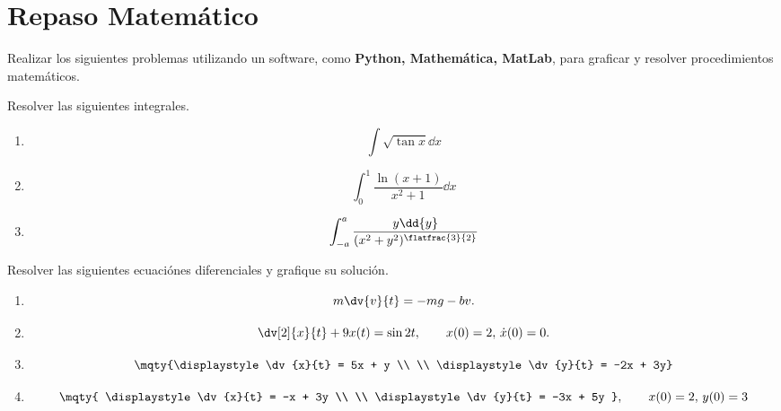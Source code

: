 \section{Repaso Matemático}

Realizar los siguientes problemas utilizando un software, como \textbf{Python, Mathemática, MatLab}, para graficar y resolver procedimientos matemáticos.

\begin{mdframed}[style=warning]
	\begin{ejercicio}
		Resolver las siguientes integrales.
		\begin{enumerate}
			\item $$\int \sqrt{\tan{x}} \dd{x}$$
			\item $$\int _0 ^1 \frac{\ln{(x + 1)}}{x^2 + 1} \dd{x}$$
			\item $$\int _{-a} ^a \frac{y\dd{y}}{(x^2 + y^2)^{\flatfrac{3}{2}}}$$
		\end{enumerate}
	\end{ejercicio}
\end{mdframed}

\begin{mdframed}[style=warning]
	\begin{ejercicio}
		Resolver las siguientes ecuaciónes diferenciales y grafique su solución.
		\begin{enumerate}
			\item $$m\dv{v}{t} = -mg - bv.$$
			\item $$\dv[2]{x}{t} + 9x(t) = \sin{2t}, \quad \quad x(0) = 2, \, \dot{x} (0) = 0.$$
			\item $$ \mqty{\displaystyle\dv{x}{t} = 5x + y \\ \\ \displaystyle\dv{y}{t} = -2x + 3y} $$
			\item $$ \mqty{ \displaystyle\dv{x}{t} = -x + 3y \\ \\ \displaystyle\dv{y}{t} =  -3x + 5y }, \quad \quad x(0) = 2, \, y(0) = 3 $$
		\end{enumerate}
	\end{ejercicio}
\end{mdframed}

